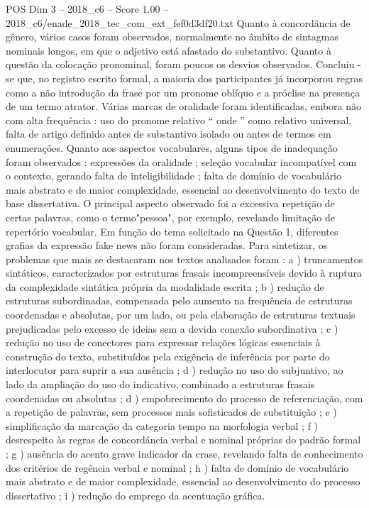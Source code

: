 \begin{textsample}{POS Dim 3 – 2018\_c6 – Score 1.00 – 2018\_c6/enade\_2018\_tec\_com\_ext\_fef0d3df20.txt}
Quanto à concordância de gênero, vários casos foram observados, normalmente no âmbito de sintagmas nominais longos, em que o adjetivo está afastado do substantivo.
Quanto à questão da colocação pronominal, foram poucos os desvios observados.
Concluiu -se que, no registro escrito formal, a maioria dos participantes já incorporou regras como a não introdução da frase por um pronome oblíquo e a próclise na presença de um termo atrator.
Várias marcas de oralidade foram identificadas, embora não com alta frequência : uso do pronome relativo “ onde ” como relativo universal, falta de artigo definido antes de substantivo isolado ou antes de termos em enumerações.
Quanto aos aspectos vocabulares, alguns tipos de inadequação foram observados : expressões da oralidade ; seleção vocabular incompatível com o contexto, gerando falta de inteligibilidade ; falta de domínio de vocabulário mais abstrato e de maior complexidade, essencial ao desenvolvimento do texto de base dissertativa.
O principal aspecto observado foi a excessiva repetição de certas palavras, como o termo"pessoa", por exemplo, revelando limitação de repertório vocabular.
Em função do tema solicitado na Questão 1, diferentes grafias da expressão fake news não foram consideradas.
Para sintetizar, os problemas que mais se destacaram nos textos analisados foram : a ) truncamentos sintáticos, caracterizados por estruturas frasais incompreensíveis devido à ruptura da complexidade sintática própria da modalidade escrita ; b ) redução de estruturas subordinadas, compensada pelo aumento na frequência de estruturas coordenadas e absolutas, por um lado, ou pela elaboração de estruturas textuais prejudicadas pelo excesso de ideias sem a devida conexão subordinativa ; c ) redução no uso de conectores para expressar relações lógicas essenciais à construção do texto, substituídos pela exigência de inferência por parte do interlocutor para suprir a sua ausência ; d ) redução no uso do subjuntivo, ao lado da ampliação do uso do indicativo, combinado a estruturas frasais coordenadas ou absolutas ; d ) empobrecimento do processo de referenciação, com a repetição de palavras, sem processos mais sofisticados de substituição ; e ) simplificação da marcação da categoria tempo na morfologia verbal ; f ) desrespeito às regras de concordância verbal e nominal próprias do padrão formal ; g ) ausência do acento grave indicador da crase, revelando falta de conhecimento dos critérios de regência verbal e nominal ; h ) falta de domínio de vocabulário mais abstrato e de maior complexidade, essencial ao desenvolvimento do processo dissertativo ; i ) redução do emprego da acentuação gráfica.

\end{textsample}
